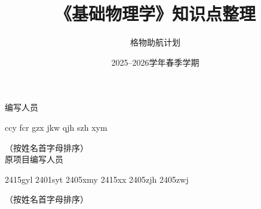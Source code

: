 \documentclass[twoside]{ctexbook}
\title{《基础物理学》知识点整理}
\author{\kaishu \zihao{4}格物助航计划}
\date{2025--2026学年春季学期}
\theoremstyle{plain}
\theoremstyle{definition}
\theoremstyle{remark}
\begin{document}
\maketitle
\clearpage
\begin{center}
    \heiti {}编写人员

    \kaishu {}ccy
    \kaishu {}fcr
    \kaishu {}gzx
    \kaishu {}jkw
    \kaishu {}qjh
    \kaishu {}szh
    \kaishu {}xym

    （按姓名首字母排序）\\[1em]

    \heiti {}原项目编写人员

    \kaishu {}2415gyl
    \kaishu {}2401syt
    \kaishu {}2405xmy
    \kaishu {}2415xx
    \kaishu {}2405zjh
    \kaishu {}2405zwj

    （按姓名首字母排序）
\end{center}





\tableofcontents

\cleardoublepage



















% 
% 
% 

% 
% 
% 
% 
% 
% 
% 

% 
% 
% 
% 
% 
% 
% 
% 
% 
\end{document}
